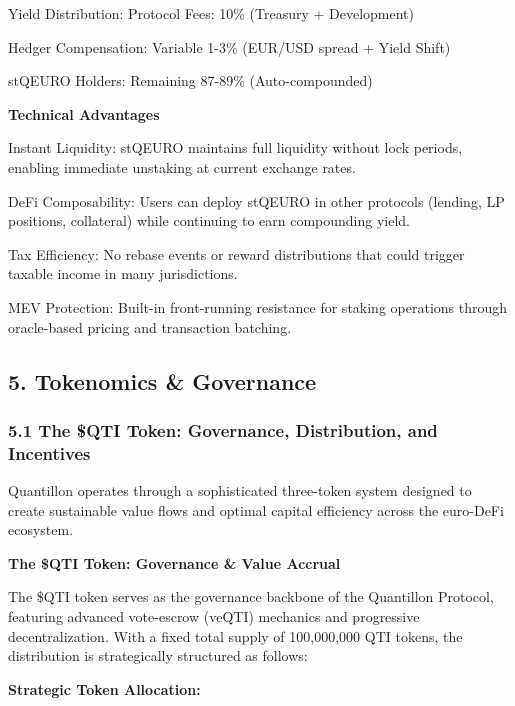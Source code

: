 Yield Distribution: Protocol Fees: 10\% (Treasury + Development)

Hedger Compensation: Variable 1-3\% (EUR/USD spread + Yield Shift)

stQEURO Holders: Remaining 87-89\% (Auto-compounded)

\textbf{Technical Advantages}

Instant Liquidity: stQEURO maintains full liquidity without lock
periods, enabling immediate unstaking at current exchange rates.

DeFi Composability: Users can deploy stQEURO in other protocols
(lending, LP positions, collateral) while continuing to earn compounding
yield.

Tax Efficiency: No rebase events or reward distributions that could
trigger taxable income in many jurisdictions.

MEV Protection: Built-in front-running resistance for staking operations
through oracle-based pricing and transaction batching.

\hypertarget{tokenomics-governance}{%
\subsection{5. Tokenomics \& Governance}\label{tokenomics-governance}}

\hypertarget{the-qti-token-governance-distribution-and-incentives}{%
\subsubsection{5.1 The \$QTI Token: Governance, Distribution, and
Incentives}\label{the-qti-token-governance-distribution-and-incentives}}

Quantillon operates through a sophisticated three-token system designed
to create sustainable value flows and optimal capital efficiency across
the euro-DeFi ecosystem.

\textbf{The \$QTI Token: Governance \& Value Accrual}

The \$QTI token serves as the governance backbone of the Quantillon
Protocol, featuring advanced vote-escrow (veQTI) mechanics and
progressive decentralization. With a fixed total supply of 100,000,000
QTI tokens, the distribution is strategically structured as follows:

\textbf{Strategic Token Allocation:}

